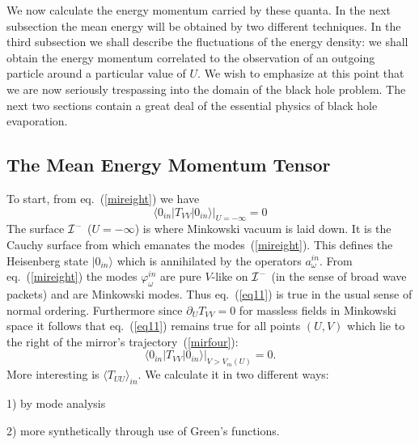 \documentclass[12pt,oneside]{report}
\def\ket#1{|#1\rangle}
\begin{document}
We now calculate the energy momentum carried by these quanta. In the
next subsection the mean energy will be obtained by two different
techniques. In the third subsection we shall describe the fluctuations of
the energy density: we shall obtain the energy momentum correlated
to the observation of an outgoing particle around a particular
value of $U$. We wish to emphasize at this point that we are now seriously
trespassing into the domain of the black hole problem. The next two sections
contain a great deal of the essential physics of black hole evaporation.

\subsection{The Mean Energy Momentum Tensor} \label{Mean}

To start, from eq.~(\ref{mireight}) we have
\begin{equation}
\langle 0_{in} \vert T_{VV} \vert 0_{in} \rangle
\vert_{U=-\infty} =0
\label{eq11}
\end{equation}
The surface ${\cal I}^-$  ($U=-\infty$) is where
Minkowski vacuum is laid down. It is the Cauchy surface
from which emanates the modes~(\ref{mireight}). This defines the
Heisenberg state $\ket{0_{in}}$ which is annihilated by the
operators $a^{in}_\omega$. From eq.~(\ref{mireight}) the modes $\varphi
^{in}_\omega$ are pure $V$-like on ${\cal I}^-$ (in the sense of broad wave
packets) and are Minkowski modes. Thus eq.~(\ref{eq11}) is true in the
usual sense of normal ordering. Furthermore since
$\partial_U T_{VV}=0$ for massless fields in Minkowski
space it follows that eq.~(\ref{eq11}) remains true for all points
$(U,V)$ which lie to the right of the mirror's
trajectory~(\ref{mirfour}):
\begin{equation} 
\langle 0_{in} \vert T_{VV} \vert
0_{in} \rangle \vert_{V>V_m(U)} =0 .
\label{eq11B}
\end{equation}
More interesting is $\langle T_{UU} \rangle_{in}$. We
calculate it in two different ways: 

1) by mode analysis 

2)
more synthetically through use of Green's functions. 
\end{document}
